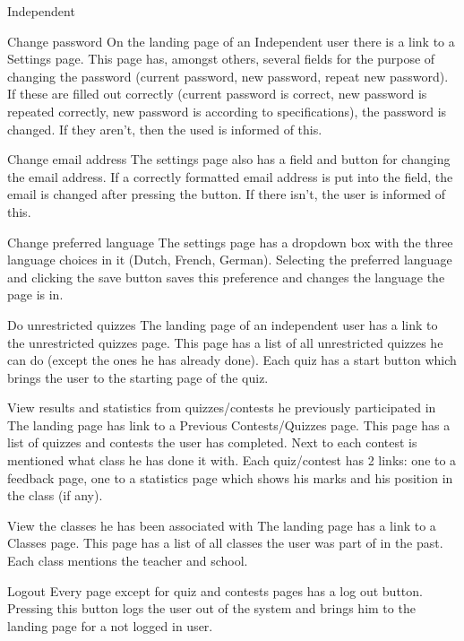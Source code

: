 \begin{section}{Independent}

    \begin{subsection}{Change password}
		\label{indep-pass}
		On the landing page of an Independent user there is a link to a Settings page. This page has, amongst others, several fields for the purpose of changing the password (current password, new password, repeat new password). If these are filled out correctly (current password is correct, new password is repeated correctly, new password is according to specifications), the password is changed. If they aren't, then the used is informed of this.
    \end{subsection}
    \begin{subsection}{Change email address}
    	\label{indep-email}
    	The settings page also has a field and button for changing the email address. If a correctly formatted email address is put into the field, the email is changed after pressing the button. If there isn't, the user is informed of this.
    \end{subsection}
    \begin{subsection}{Change preferred language}
    The settings page has a dropdown box with the three language choices in it (Dutch, French, German). Selecting the preferred language and clicking the save button saves this preference and changes the language the page is in.
    	\label{indep-lang}
    \end{subsection}
    \begin{subsection}{Do unrestricted quizzes}
    	\label{indep-unrest}
    	The landing page of an independent user has a link to the unrestricted quizzes page. This page has a list of all unrestricted quizzes he can do (except the ones he has already done). Each quiz has a start button which brings the user to the starting page of the quiz.
    \end{subsection}
    \begin{subsection}{View results and statistics from quizzes/contests he previously participated in}
    	\label{indep-resstat}
    	The landing page has link to a Previous Contests/Quizzes page. This page has a list of quizzes and contests the user has completed. Next to each contest is mentioned what class he has done it with. Each quiz/contest has 2 links: one to a feedback page, one to a statistics page which shows his marks and his position in the class (if any).
    \end{subsection}
    \begin{subsection}{View the classes he has been associated with}
    The landing page has a link to a Classes page. This page has a list of all classes the user was part of in the past. Each class mentions the teacher and school.
    	\label{indep-class}
    \end{subsection}
    \begin{subsection}{Logout}
    	\label{indep-logout}
    	Every page except for quiz and contests pages has a log out button. Pressing this button logs the user out of the system and brings him to the landing page for a not logged in user.
    \end{subsection}
    

\end{section}
